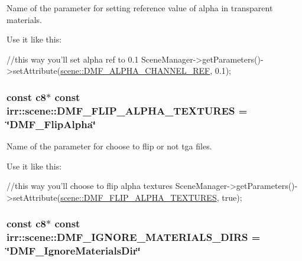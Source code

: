 Name of the parameter for setting reference value of alpha in transparent materials. 

Use it like this\+: 
\begin{DoxyCode}
\textcolor{comment}{//this way you'll set alpha ref to 0.1}
SceneManager->getParameters()->setAttribute(\hyperlink{namespaceirr_1_1scene_afd6e025453e80983de80371dc56718ef}{scene::DMF\_ALPHA\_CHANNEL\_REF}, 0.1);
\end{DoxyCode}
\subsubsection[{\texorpdfstring{D\+M\+F\+\_\+\+F\+L\+I\+P\+\_\+\+A\+L\+P\+H\+A\+\_\+\+T\+E\+X\+T\+U\+R\+ES}{DMF\_FLIP\_ALPHA\_TEXTURES}}]{\setlength{\rightskip}{0pt plus 5cm}const {\bf c8}$\ast$ const irr\+::scene\+::\+D\+M\+F\+\_\+\+F\+L\+I\+P\+\_\+\+A\+L\+P\+H\+A\+\_\+\+T\+E\+X\+T\+U\+R\+ES = \char`\"{}D\+M\+F\+\_\+\+Flip\+Alpha\char`\"{}}\hypertarget{namespaceirr_1_1scene_acdc1ddd0bfeb4118a5d8f3ea953717f6}{}\label{namespaceirr_1_1scene_acdc1ddd0bfeb4118a5d8f3ea953717f6}


Name of the parameter for choose to flip or not tga files. 

Use it like this\+: 
\begin{DoxyCode}
\textcolor{comment}{//this way you'll choose to flip alpha textures}
SceneManager->getParameters()->setAttribute(\hyperlink{namespaceirr_1_1scene_acdc1ddd0bfeb4118a5d8f3ea953717f6}{scene::DMF\_FLIP\_ALPHA\_TEXTURES}, \textcolor{keyword}{
      true});
\end{DoxyCode}
\subsubsection[{\texorpdfstring{D\+M\+F\+\_\+\+I\+G\+N\+O\+R\+E\+\_\+\+M\+A\+T\+E\+R\+I\+A\+L\+S\+\_\+\+D\+I\+RS}{DMF\_IGNORE\_MATERIALS\_DIRS}}]{\setlength{\rightskip}{0pt plus 5cm}const {\bf c8}$\ast$ const irr\+::scene\+::\+D\+M\+F\+\_\+\+I\+G\+N\+O\+R\+E\+\_\+\+M\+A\+T\+E\+R\+I\+A\+L\+S\+\_\+\+D\+I\+RS = \char`\"{}D\+M\+F\+\_\+\+Ignore\+Materials\+Dir\char`\"{}}\hypertarget{namespaceirr_1_1scene_ae996d826263cf504dd0260d0a096b0d0}{}\label{namespaceirr_1_1scene_ae996d826263cf504dd0260d0a096b0d0}



